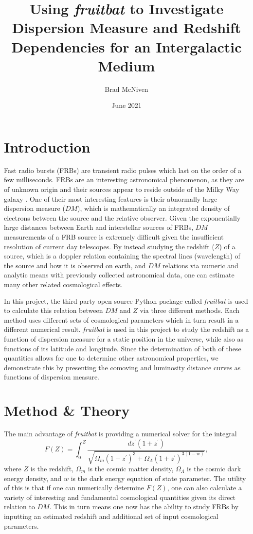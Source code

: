 \documentclass{article}
\title{Using {\it fruitbat} to Investigate Dispersion Measure and Redshift Dependencies for an Intergalactic Medium}
\author{Brad McNiven}
\date{June 2021}
\begin{document}
\maketitle



\section{Introduction}

Fast radio bursts (FRBs) are transient radio pulses which last on the order of a few milliseconds. FRBs are an interesting astronomical phenomenon, as they are of unknown origin and their sources appear to reside outside of the Milky Way galaxy \cite{Petroff}. One of their most interesting features is their abnormally large dispersion measure ($DM$), which is mathematically an integrated density of electrons between the source and the relative observer. Given the exponentially large distances between Earth and interstellar sources of FRBs, $DM$ measurements of a FRB source is extremely difficult given the insufficient resolution of current day telescopes. By instead studying the redshift ($Z$) of a source, which is a doppler relation containing the spectral lines (wavelength) of the source and how it is observed on earth, and $DM$ relations via numeric and analytic means with previously collected astronomical data, one can estimate many other related cosmological effects.

In this project, the third party open source Python package called {\it fruitbat} \cite{fruitbat} is used to calculate this relation between $DM$ and $Z$ via three different methods. Each method uses different sets of cosmological parameters which in turn result in a different numerical result. {\it fruitbat} is used in this project to study the redshift as a function of dispersion measure for a static position in the universe, while also as functions of its latitude and longitude. Since the determination of both of these quantities allows for one to determine other astronomical properties, we demonstrate this by presenting the comoving and luminosity distance curves as functions of dispersion measure.

\section{Method \& Theory}

The main advantage of {\it fruitbat} is providing a numerical solver for the integral
\begin{equation}
F(Z) = \int_0^Z \frac{dz^{\prime}(1 + z ^\prime )}{\sqrt{\Omega_m(1+z^\prime)^3 + \Omega_{\Lambda} (1+z^\prime)^{3(1-w)}}},
\label{eq:integral}
\end{equation}
where $Z$ is the redshift, $\Omega_m$ is the cosmic matter density, $\Omega_\Lambda$ is the cosmic dark energy density, and $w$ is the dark energy equation of state parameter. The utility of this is that if one can numerically determine $F(Z)$, one can also calculate a variety of interesting and fundamental cosmological quantities given its direct relation to $DM$. This in turn means one now has the ability to study FRBs by inputting an estimated redshift and additional set of input cosmological parameters. 
\end{document}
